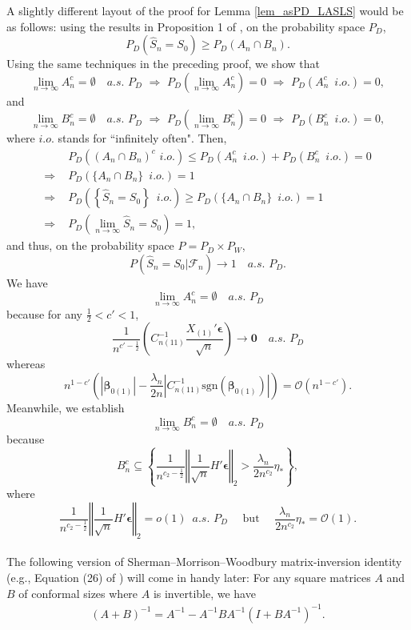 \documentclass[ejs,authoryear,linksfromyear]{imsart}
\numberwithin{equation}{section}
\theoremstyle{plain}
\begin{document}
A slightly different layout of the proof for Lemma \ref{lem_asPD_LASLS} would be as follows: using the results in Proposition 1 of \citet{BinYu}, on the probability space $P_D$,
$$
P_D \left(
	\widehat{S}_n = S_0	
\right)	
\geq 
P_D \left(
A_n \cap B_n
\right). 
$$ 
Using the same techniques in the preceding proof, we show that
$$
\lim_{n \to \infty} A_n^c = \emptyset \quad a.s. \,\, P_D
\,\, \Longrightarrow \,\, 
P_D \left(  \lim_{n \to \infty} A_n^c \right) = 0
\,\, \Longrightarrow \,\, 
P_D \left(  A_n^c \,\,\, i.o. \right) = 0,
$$
and
$$
\lim_{n \to \infty} B_n^c = \emptyset \quad a.s. \,\, P_D
\,\, \Longrightarrow \,\, 
P_D \left(  \lim_{n \to \infty} B_n^c \right) = 0
\,\, \Longrightarrow \,\, 
P_D \left(  B_n^c \,\,\, i.o. \right) = 0,
$$
where $i.o.$ stands for ``infinitely often". Then,
\begin{align*}
&P_D \left(
	\left( A_n \cap B_n  \right)^c
	\,\, i.o.
\right)
\leq P_D \left( A_n^c \,\,\, i.o. \right) +
P_D \left( B_n^c \,\,\, i.o. \right) =0 \\
\Longrightarrow \,\,
&P_D \left(
\{ A_n \cap B_n  \}
\,\,\, i.o.
\right) = 1 \\
\Longrightarrow \,\,
&P_D \left(
	\left\{ \widehat{S}_n = S_0 \right\}
	\,\,\, i.o. 
\right)	
\geq 
P_D \left(
	\{ A_n \cap B_n \} 
	\,\,\, i.o. 
\right) = 1 \\
\Longrightarrow \,\,
&P_D \left(
	\lim_{n \to \infty} 
	\widehat{S}_n = S_0
\right) = 1, 
\end{align*}
and thus, on the probability space $P = P_D \times P_W$,
$$
P\left(
\widehat{S}_n = S_0	
\Big| \mathcal{F}_n 
\right)	
\to 1
\quad a.s. \,\, P_D.
$$
We have
$$
\lim_{n \to \infty} A_n^c = \emptyset \quad a.s. \,\, P_D
$$
because for any $\frac{1}{2} < c' < 1$,
$$
\dfrac{1}{n^{c' - \frac{1}{2} }}
\left(
C_{n(11)}^{-1}
\dfrac{X_{(1)}' \bm{\epsilon}}{\sqrt{n}} 
\right)
\to \bm{0} \quad a.s. \,\, P_D
$$
whereas
$$
n^{1 - c'}
\left(
\left\vert  \bm{\beta}_{0(1)} \right\vert
- \dfrac{\lambda_n}{2n}
\left\vert
C_{n(11)}^{-1}
\text{sgn} \left( \bm{\beta}_{0(1)} \right)
\right\vert
\right)
= \mathcal{O} \left( n^{1 - c'} \right).
$$ 
Meanwhile, we establish
$$
\lim_{n \to \infty} B_n^c = \emptyset \quad a.s. \,\, P_D
$$
because 
$$
B_n^c \subseteq 
\left\{
\dfrac{1}{n^{c_2 - \frac{1}{2} }}
\left\Vert
\dfrac{1}{\sqrt{n}} H' \bm{\epsilon}
\right\Vert_2
> \frac{\lambda_n}{2 n^{c_2}} \eta_*	
\right\},
$$
where 
$$
\dfrac{1}{n^{c_2 - \frac{1}{2} }}
\left\Vert
\dfrac{1}{\sqrt{n}} H' \bm{\epsilon}
\right\Vert_2
= o(1) \,\,\, a.s. \,\, P_D 
\quad \text{ but }
\quad 
\frac{\lambda_n}{2 n^{c_2}} \eta_*
= \mathcal{O}(1).
$$
\\
The following version of Sherman–Morrison–Woodbury matrix-inversion identity (e.g., Equation (26) of \citet{MatrixIdentity}) will come in handy later: For any square matrices $A$ and $B$ of conformal sizes where $A$ is invertible, we have
	\begin{align} \label{eq:MatrixIdentity}
	(A+B)^{-1} = A^{-1} - A^{-1} B A^{-1} 
	\left(
		I + B A^{-1}
		\right)^{-1}.
	\end{align}
\end{document}
